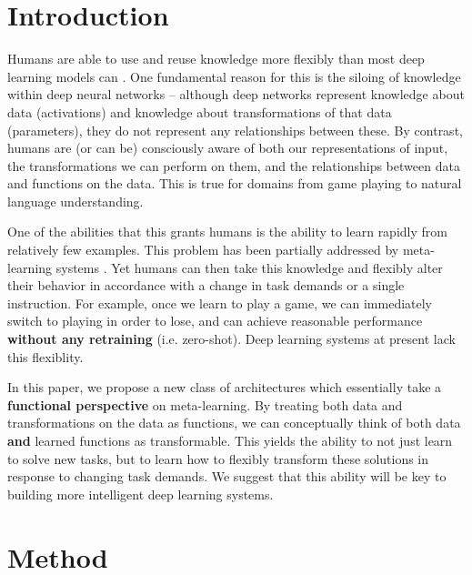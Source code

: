 \documentclass[11pt]{article}
\begin{document}
\section{Introduction}
Humans are able to use and reuse knowledge more flexibly than most deep learning models can \citep{Lake2017}. One fundamental reason for this is the siloing of knowledge within deep neural networks -- although deep networks represent knowledge about data (activations) and knowledge about transformations of that data (parameters), they do not represent any relationships between these. By contrast, humans are (or can be) consciously aware of both our representations of input, the transformations we can perform on them, and the relationships between data and functions on the data. This is true for domains from game playing to natural language understanding. \par
One of the abilities that this grants humans is the ability to learn rapidly from relatively few examples. This problem has been partially addressed by meta-learning systems \citep{}. Yet humans can then take this knowledge and flexibly alter their behavior in accordance with a change in task demands or a single instruction. For example, once we learn to play a game, we can immediately switch to playing in order to lose, and can achieve reasonable performance \textbf{without any retraining} (i.e. zero-shot). Deep learning systems at present lack this flexiblity. \par
In this paper, we propose a new class of architectures which essentially take a \textbf{functional perspective} on meta-learning. By treating both data and transformations on the data as functions, we can conceptually think of both data \textbf{and} learned functions as transformable. This yields the ability to not just learn to solve new tasks, but to learn how to flexibly transform these solutions in response to changing task demands. We suggest that this ability will be key to building more intelligent deep learning systems. \par

\section{Method}
\end{document}
